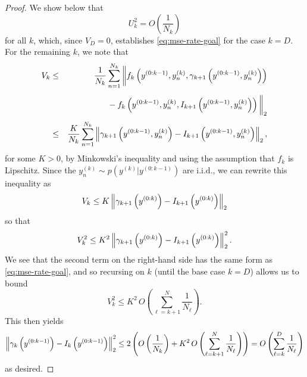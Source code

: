 \begin{proof}
  We show below that
  \begin{equation} \label{eq:mse-Uk-goal}
    U_k^2 = O\left(\frac{1}{N_k}\right)
  \end{equation}
  for all $k$, which, since $V_D = 0$, establishes \eqref{eq:mse-rate-goal} for the case
  $k = D$. For the remaining $k$, we note that
  \begin{eqnarray*}
    V_k &\leq& \frac{1}{N_k} \sum_{n=1}^{N_k}
      \bigg\Vert f_k\left(y^{(0:k-1)}, y^{(k)}_n, \gamma_{k+1}\left(y^{(0:k-1)}, y^{(k)}_n\right)\right) \\
    &\phantom{\leq}& \phantom{\frac{1}{N_k} \sum_{n=1}^{N_k}\bigg\Vert} 
    - f_k\left(y^{(0:k-1)}, y^{(k)}_n, I_{k+1}\left(y^{(0:k-1)}, y^{(k)}_n\right)\right) \bigg\Vert_2 \\
    &\leq& \frac{K}{N_k} \sum_{n=1}^{N_k} \norm{\gamma_{k+1}\left(y^{(0:k-1)}, y^{(k)}_n\right) - I_{k+1}\left(y^{(0:k-1)}, y^{(k)}_n\right)}_2,
  \end{eqnarray*}
  for some $K > 0$, by Minkowski's inequality and using the assumption that $f_k$ is
  Lipschitz. Since the $y_n^{(k)} \sim p(y^{(k)}|y^{(0:k-1)})$ are i.i.d., we can rewrite
  this inequality as
  \[
    V_k \leq K \left\lVert\gamma_{k+1}\left(y^{(0:k)}\right) - I_{k+1}\left(y^{(0:k)}\right)\right\rVert_2
  \]
  so that
  \[
    V_k^2 \leq K^2 \left\lVert\gamma_{k+1}\left(y^{(0:k)}\right) - I_{k+1}\left(y^{(0:k)}\right)\right\rVert_2^2.
  \]
  We see that the second term on the right-hand side has the same form as
  \eqref{eq:mse-rate-goal}, and so recursing on $k$ (until the base case $k = D$) allows
  us to bound
  \[
    V_k^2 \leq K^2 \, O\left(\sum_{\ell=k+1}^N \frac{1}{N_\ell} \right).
  \]
  This then yields
  \[
    \left\lVert\gamma_k\left(y^{(0:k-1)}\right) - I_k\left(y^{(0:k-1)}\right)\right\rVert^2_2
    \leq 2 \left(O\left(\frac{1}{N_k}\right) + K^2 \, O\left(\sum_{\ell=k+1}^N \frac{1}{N_\ell} \right) \right)
    = O\left(\sum_{\ell=k}^D \frac{1}{N_\ell}\right)
  \]
  as desired.


\end{proof}
